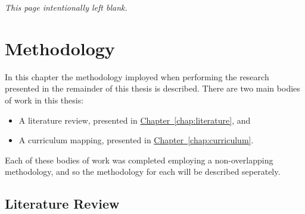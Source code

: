 \documentclass[twoside,12pt,a4paper]{report}
\makeatletter
\newcommand*{\intentionallyblankpage}{
  \vspace*{\fill}
  {\centering \textit{This page intentionally left blank.} \par}
  \vspace{\fill}}
\renewcommand*{\cleardoublepage}{\clearpage\if@twoside \ifodd\c@page\else
  \intentionallyblankpage
  \newpage
  \if@twocolumn\hbox{}\newpage\fi\fi\fi}
\newcommand{\refchap}[1]{\hyperref[chap:#1]{Chapter~\ref{chap:#1}}}
\makeatother
\begin{document}
\cleardoublepage
\chapter{Methodology}
\label{chap:methodology}

In this chapter the methodology imployed when performing the research presented in the remainder of this thesis is described. There are two main bodies of work in this thesis:
\begin{itemize}
	\item A literature review, presented in \refchap{literature}, and 
	\item A curriculum mapping, presented in \refchap{curriculum}.
\end{itemize}
Each of these bodies of work was completed employing a non-overlapping methodology, and so the methodology for each will be described seperately.

\section{Literature Review}
\end{document}
